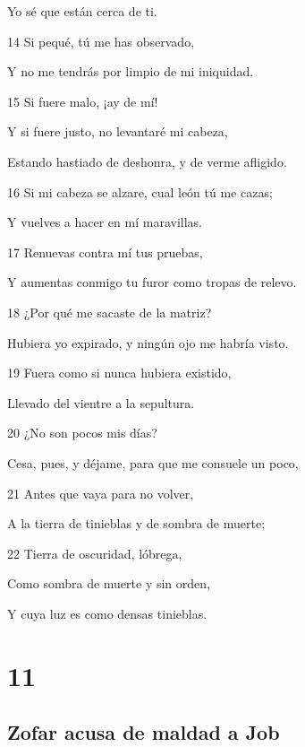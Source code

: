 \par Yo sé que están cerca de ti.
\par 14 Si pequé, tú me has observado,
\par Y no me tendrás por limpio de mi iniquidad. 
\par 15 Si fuere malo, ¡ay de mí!
\par Y si fuere justo, no levantaré mi cabeza,
\par Estando hastiado de deshonra, y de verme afligido.
\par 16 Si mi cabeza se alzare, cual león tú me cazas;
\par Y vuelves a hacer en mí maravillas.
\par 17 Renuevas contra mí tus pruebas,
\par Y aumentas conmigo tu furor como tropas de relevo.
\par 18 ¿Por qué me sacaste de la matriz?
\par Hubiera yo expirado, y ningún ojo me habría visto.
\par 19 Fuera como si nunca hubiera existido,
\par Llevado del vientre a la sepultura.
\par 20 ¿No son pocos mis días?
\par Cesa, pues, y déjame, para que me consuele un poco,
\par 21 Antes que vaya para no volver,
\par A la tierra de tinieblas y de sombra de muerte;
\par 22 Tierra de oscuridad, lóbrega,
\par Como sombra de muerte y sin orden,
\par Y cuya luz es como densas tinieblas.

\chapter{11}

\section*{Zofar acusa de maldad a Job}

